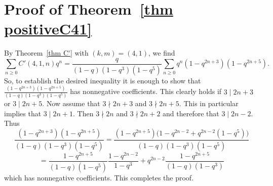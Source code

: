 \documentclass[reqno]{amsart}
\theoremstyle{definition}
\theoremstyle{plain}
\theoremstyle{remark}
\numberwithin{equation}{section}
\newcommand{\fr}{\frac}
\begin{document}
\section{Proof of Theorem~\ref{thm positiveC41}}\label{sec proof thm positiveC42}
%
By Theorem~\ref{thm C'} with $(k,m)=(4,1)$, we find
\[
\sum_{n\geq 0}C'(4,1,n)q^n = \fr{q}{(1-q)(1-q^3)(1-q^5)}\sum_{n\geq 0} q^n (1-q^{2n+3})(1-q^{2n+5}).
\]
So, to establish the desired inequality it is enough to show that $\fr{(1-q^{2n+3})(1-q^{2n+5})}{(1-q)(1-q^3)(1-q^5)}$ has nonnegative coefficients.
This clearly holds if $3\mid 2n+3$ or $3\mid 2n+5$. Now assume that $3\nmid 2n+3$ and $3\nmid 2n+5$. This in particular implies that $3\mid 2n+1$.
Then $3\nmid 2n$ and $3\nmid 2n+2$ and therefore that $3\mid 2n-2$.
Thus
\[
\fr{(1-q^{2n+3})(1-q^{2n+5})}{(1-q)(1-q^3)(1-q^5)}
=\fr{(1-q^{2n+5})\big( 1-q^{2n-2} +q^{2n-2}(1-q^5)\big)}{(1-q)(1-q^3)(1-q^5)}
\]
\[
=\fr{1-q^{2n+5}}{(1-q)(1-q^5)} \fr{1-q^{2n-2}}{1-q^3}
+q^{2n-2} \fr{1-q^{2n+5}}{(1-q)(1-q^3)}
\]
which has nonnegative coefficients. This completes the proof.
%
\end{document}
